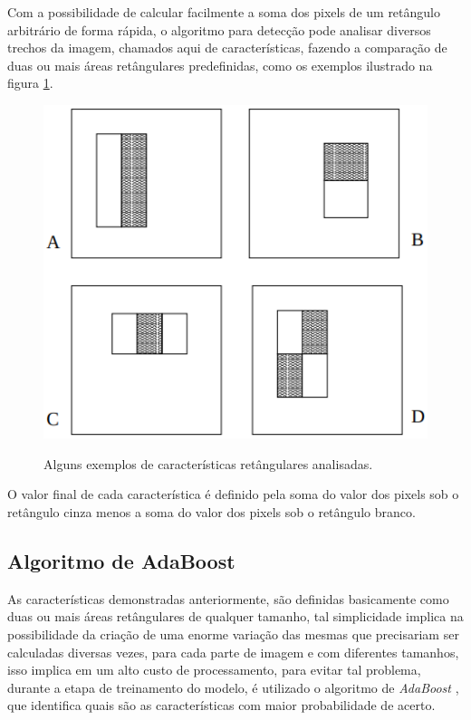 Com a possibilidade de calcular facilmente a soma dos pixels de um retângulo arbitrário de forma rápida, o algoritmo para detecção pode analisar diversos trechos da imagem, chamados aqui de características, fazendo a comparação de duas ou mais áreas retângulares predefinidas, como os exemplos ilustrado na figura \ref{fig:features}. 

\begin{figure}[htb]
    \centering
    \caption{Alguns exemplos de características retângulares analisadas.}
    \includegraphics[scale=.5]{figs/features.png}
    \label{fig:features}
 \end{figure}

 O valor final de cada característica é definido pela soma do valor dos pixels sob o retângulo cinza menos a soma do valor dos pixels sob o retângulo branco.

\subsection{Algoritmo de AdaBoost}

As características demonstradas anteriormente, são definidas basicamente como duas ou mais áreas retângulares de qualquer tamanho, tal simplicidade implica na possibilidade da criação de uma enorme variação das mesmas que precisariam ser calculadas diversas vezes, para cada parte de imagem e com diferentes tamanhos, isso implica em um alto custo de processamento, para evitar tal problema, durante a etapa de treinamento do modelo, é utilizado o algoritmo de \textit{AdaBoost} \cite{adaboost-Freund}, que identifica quais são as características com maior probabilidade de acerto.

